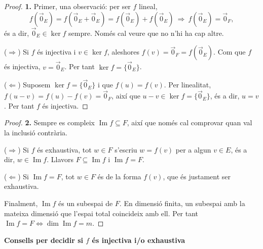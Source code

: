 \documentclass[12pt]{article}
\begin{document}
\begin{proof}
    \textbf{1.} Primer, una observació: per ser $f$ lineal,
    \[
        f(\vec{0}_E)=f(\vec{0}_E+\vec{0}_E)=f(\vec{0}_E)+f(\vec{0}_E)
        \ \Longrightarrow\ f(\vec{0}_E)=\vec{0}_F ,
    \]
    és a dir, $\vec{0}_E\in\ker f$ sempre. Només cal veure que no n'hi ha cap altre.
 
    ($\Rightarrow$) Si $f$ és injectiva i $v\in\ker f$, aleshores $f(v)=\vec{0}_F=f(\vec{0}_E)$.
    Com que $f$ és injectiva, $v=\vec{0}_E$. Per tant $\ker f=\{\vec{0}_E\}$.
 
    ($\Leftarrow$) Suposem $\ker f=\{\vec{0}_E\}$ i que $f(u)=f(v)$. Per linealitat,
    $f(u-v)=f(u)-f(v)=\vec{0}_F$, així que $u-v\in\ker f=\{\vec{0}_E\}$, és a dir, $u=v$.
    Per tant $f$ és injectiva.
\end{proof}
 
\begin{proof}
    \textbf{2.} Sempre es compleix $\operatorname{Im} f\subseteq F$, així que només cal
    comprovar quan val la inclusió contrària.
 
    ($\Rightarrow$) Si $f$ és exhaustiva, tot $w\in F$ s'escriu $w=f(v)$ per a algun $v\in E$,
    és a dir, $w\in\operatorname{Im} f$. Llavors $F\subseteq\operatorname{Im} f$ i
    $\operatorname{Im} f=F$.
 
    ($\Leftarrow$) Si $\operatorname{Im} f=F$, tot $w\in F$ és de la forma $f(v)$, que és
    justament ser exhaustiva.
 
    Finalment, $\operatorname{Im} f$ és un subespai de $F$. En dimensió finita, un
    subespai amb la mateixa dimensió que l'espai total coincideix amb ell. Per tant
    $\operatorname{Im} f=F\iff\dim\operatorname{Im} f=m$.
\end{proof}
 
\bigskip
\noindent\textbf{Consells per decidir si $f$ és injectiva i/o exhaustiva}
 
\end{document}
